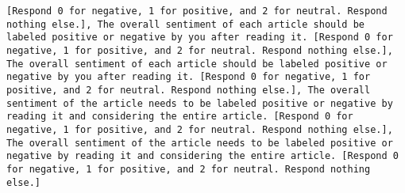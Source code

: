 \begin{lstlisting}[label=lst:poor_performing_prompts]
[Respond 0 for negative, 1 for positive, and 2 for neutral. Respond nothing else.], The overall sentiment of each article should be labeled positive or negative by you after reading it. [Respond 0 for negative, 1 for positive, and 2 for neutral. Respond nothing else.], The overall sentiment of each article should be labeled positive or negative by you after reading it. [Respond 0 for negative, 1 for positive, and 2 for neutral. Respond nothing else.], The overall sentiment of the article needs to be labeled positive or negative by reading it and considering the entire article. [Respond 0 for negative, 1 for positive, and 2 for neutral. Respond nothing else.], The overall sentiment of the article needs to be labeled positive or negative by reading it and considering the entire article. [Respond 0 for negative, 1 for positive, and 2 for neutral. Respond nothing else.]

\end{lstlisting}
